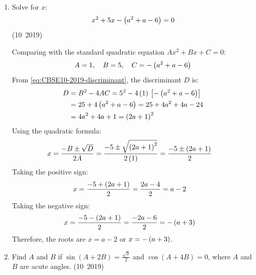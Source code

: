 \begin{enumerate}[label=\thesubsection.\arabic*, ref=\thesubsection.\theenumi]
	\item Solve for $x$:
	\begin{align}
		x^2 + 5x - \left(a^2 + a - 6\right) = 0
	\end{align}
	\hfill (10~2019)
	
	\solution
	Comparing with the standard quadratic equation $Ax^2 + Bx + C = 0$:
	\begin{align}
		A = 1, \quad B = 5, \quad C = -\left(a^2 + a - 6\right)
	\end{align}
	From \eqref{eq:CBSE10-2019-discriminant}, the discriminant $D$ is:
	\begin{align}
		D &= B^2 - 4AC = 5^2 - 4\left(1\right){}\left[-\left(a^2 + a - 6\right)\right] \\
		&= 25 + 4\left(a^2 + a - 6\right) = 25 + 4a^2 + 4a - 24 \\
		&= 4a^2 + 4a + 1 = \left(2a + 1\right)^2
	\end{align}
	Using the quadratic formula:
	\begin{align}
		x &= \frac{-B \pm \sqrt{D}}{2A} = \frac{-5 \pm \sqrt{\left(2a + 1\right)^2}}{2\left(1\right)} = \frac{-5 \pm \left(2a + 1\right)}{2}
	\end{align}
	Taking the positive sign:
	\begin{align}
		x &= \frac{-5 + \left(2a + 1\right)}{2} = \frac{2a - 4}{2} = a - 2
	\end{align}
	Taking the negative sign:
	\begin{align}
		x &= \frac{-5 - \left(2a + 1\right)}{2} = \frac{-2a - 6}{2} = -\left(a + 3\right)
	\end{align}
	Therefore, the roots are $x = a - 2$ or $x = -\left(a + 3\right)$.

	\item Find $A$ and $B$ if $\sin(A+2B)=\frac{\sqrt{3}}{2}$ and $\cos(A+4B)=0$, where $A$ and $B$ are acute angles.
	\hfill (10~2019)
	

\end{enumerate}
